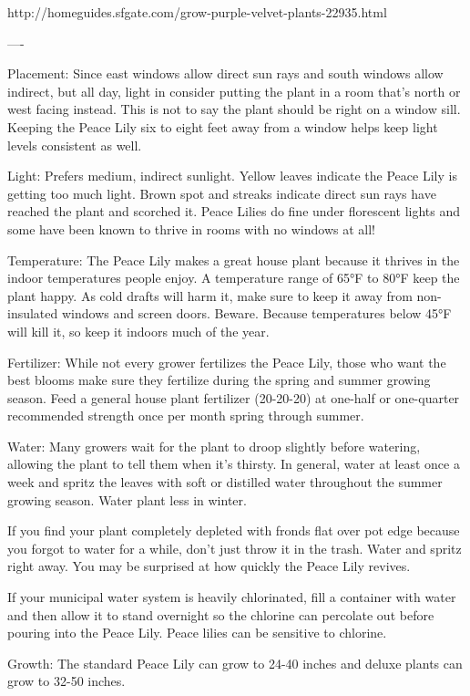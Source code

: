 \documentclass{book}
\begin{document}
http://homeguides.sfgate.com/grow-purple-velvet-plants-22935.html

----


Placement:   Since east windows allow direct sun rays and south windows allow indirect, but all day, light in consider putting the plant in a room that’s north or west facing instead. This is not to say the plant should be right on a window sill. Keeping the Peace Lily six to eight feet away from a window helps keep light levels consistent as well.

Light: Prefers medium, indirect sunlight. Yellow leaves indicate the Peace Lily is  getting too much light. Brown spot and streaks indicate direct sun rays have reached the plant and scorched it. Peace Lilies do fine under florescent lights and some have been known to thrive in rooms with no windows at all!

Temperature: The Peace Lily makes a great house plant because it thrives in the indoor temperatures people enjoy. A temperature range of 65°F to 80°F keep the plant happy. As cold drafts will harm it, make sure to keep it away from non-insulated windows and screen doors. Beware. Because temperatures below 45°F will kill it, so keep it indoors much of the year.

Fertilizer: While not every grower fertilizes the Peace Lily, those who want the best blooms make sure they fertilize during the spring and summer growing season. Feed a general house plant fertilizer (20-20-20) at one-half or one-quarter recommended strength once per month spring through summer.

Water:  Many growers wait for the plant to droop slightly before watering, allowing the plant to tell them when it’s thirsty. In general, water at least once a week and spritz the leaves with soft or distilled water throughout the summer growing season. Water plant less in winter.

If you find your plant completely depleted with fronds flat over pot edge because you forgot to water for a while, don’t just throw it in the trash. Water and spritz right away. You may be surprised at how quickly the Peace Lily revives.

If your municipal water system is heavily chlorinated, fill a container with water and then allow it to stand overnight so the chlorine can percolate out before pouring into the Peace Lily. Peace lilies can be sensitive to chlorine.

Growth:  The standard Peace Lily can grow to 24-40 inches and deluxe plants can grow to 32-50 inches.
\end{document}
